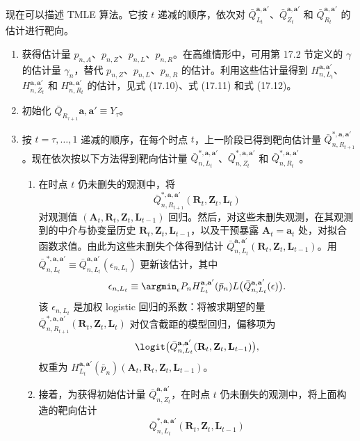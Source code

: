 现在可以描述 TMLE 算法。它按 $t$ 递减的顺序，依次对 $\bar Q_{L_t}^{\mathbf a,\mathbf a'}$、$\bar Q_{Z_t}^{\mathbf a,\mathbf a'}$ 和 $\bar Q_{R_t}^{\mathbf a,\mathbf a'}$ 的估计进行靶向。
\begin{enumerate}[label=\arabic*.]
 \item 获得估计量 $p_{n,A}$、$p_{n,Z}$、$p_{n,L}$、$p_{n,R}$。在高维情形中，可用第 17.2 节定义的 $\gamma$ 的估计量 $\gamma_n$，替代 $p_{n,Z}$、$p_{n,L}$、$p_{n,R}$ 的估计。利用这些估计量得到 $H_{n,L_t}^{\mathbf a,\mathbf a'}$、$H_{n,Z_t}^{\mathbf a,\mathbf a'}$ 和 $H_{n,R_t}^{\mathbf a,\mathbf a'}$ 的估计，见式 (17.10)、式 (17.11) 和式 (17.12)。
 \item 初始化 $\bar Q_{R_{\tau+1}}\mathbf a,\mathbf a'\equiv Y_\tau$。
 \item 按 $t=\tau,\ldots,1$ 递减的顺序，在每个时点 $t$，上一阶段已得到靶向估计量 $\bar Q_{n,R_{t+1}}^{*,\mathbf a,\mathbf a'}$。现在依次按以下方法得到靶向估计量 $\bar Q_{n,L_t}^{*,\mathbf a,\mathbf a'}$、$\bar Q_{n,Z_t}^{*,\mathbf a,\mathbf a'}$ 和 $\bar Q_{n,R_t}^{*,\mathbf a,\mathbf a'}$。
 \begin{enumerate}[label=(\alph*),leftmargin=2.4em]
  \item 在时点 $t$ 仍未删失的观测中，将
  \[
   \bar Q_{n,R_{t+1}}^{*,\mathbf a,\mathbf a'}(\mathbf R_t,\mathbf Z_t,\mathbf L_t)
  \]
  对观测值 $(\mathbf A_t,\mathbf R_t,\mathbf Z_t,\mathbf L_{t-1})$ 回归。然后，对这些未删失观测，在其观测到的中介与协变量历史 $\mathbf R_t,\mathbf Z_t,\mathbf L_{t-1}$，以及干预暴露 $\mathbf A_t=\mathbf a_t$ 处，对拟合函数求值。由此为这些未删失个体得到估计 $\bar Q_{n,L_t}^{\mathbf a,\mathbf a'}(\mathbf R_t,\mathbf Z_t,\mathbf L_{t-1})$。用 $\bar Q_{n,L_t}^{*,\mathbf a,\mathbf a'}\equiv\bar Q_{n,L_t}^{\mathbf a,\mathbf a'}(\epsilon_{n,L_t})$ 更新该估计，其中
  \[
   \epsilon_{n,L_t}\equiv\argmin_\epsilon
   P_nH_{L_t}^{\mathbf a,\mathbf a'}(\bar p_n)
   L\bigl(\bar Q_{n,L_t}^{\mathbf a,\mathbf a'}(\epsilon)\bigr).
  \]
  该 $\epsilon_{n,L_t}$ 是加权 logistic 回归的系数：将被求期望的量 $\bar Q_{n,R_{t+1}}^{*,\mathbf a,\mathbf a'}(\mathbf R_t,\mathbf Z_t,\mathbf L_t)$ 对仅含截距的模型回归，偏移项为
  \[
   \logit\bigl(\bar Q_{n,L_t}^{\mathbf a,\mathbf a'}(\mathbf R_t,\mathbf Z_t,\mathbf L_{t-1})\bigr),
  \]
  权重为 $H_{L_t}^{\mathbf a,\mathbf a'}(\bar p_n)(\mathbf A_t,\mathbf R_t,\mathbf Z_t,\mathbf L_{t-1})$。
  \item 接着，为获得初始估计量 $\bar Q_{n,Z_t}^{\mathbf a,\mathbf a'}$，在时点 $t$ 仍未删失的观测中，将上面构造的靶向估计
  \[
   \bar Q_{n,L_t}^{*,\mathbf a,\mathbf a'}(\mathbf R_t,\mathbf Z_t,\mathbf L_{t-1})
\]
\end{enumerate}
\end{enumerate}
